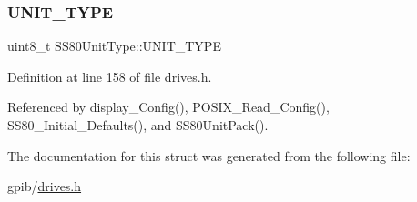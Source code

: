 \mbox{\label{structSS80UnitType_ae00e42430682e849d83b1ca4c8f44013}} 
\subsubsection{\texorpdfstring{U\+N\+I\+T\+\_\+\+T\+Y\+PE}{UNIT\_TYPE}}
{\footnotesize\ttfamily uint8\+\_\+t S\+S80\+Unit\+Type\+::\+U\+N\+I\+T\+\_\+\+T\+Y\+PE}



Definition at line 158 of file drives.\+h.



Referenced by display\+\_\+\+Config(), P\+O\+S\+I\+X\+\_\+\+Read\+\_\+\+Config(), S\+S80\+\_\+\+Initial\+\_\+\+Defaults(), and S\+S80\+Unit\+Pack().



The documentation for this struct was generated from the following file\+:\begin{DoxyCompactItemize}
\item 
gpib/\hyperlink{drives_8h}{drives.\+h}\end{DoxyCompactItemize}
